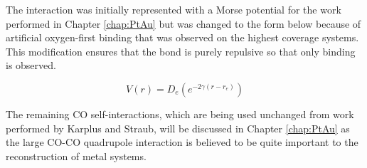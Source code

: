 The  interaction was initially represented with a Morse
potential for the work performed in Chapter \ref{chap:PtAu} but was changed to
the form below because of artificial oxygen-first binding that was observed
on the highest coverage systems. This modification ensures that
the  bond is purely repulsive so that only 
binding is observed.

\begin{equation}
V(r) = D_e(e^{-2\gamma(r-r_e)})
\end{equation}

The remaining CO self-interactions, which are being used unchanged from work
performed by Karplus and Straub,\citep{Straub:1991no} will be discussed in
Chapter \ref{chap:PtAu} as the large CO-CO quadrupole interaction is believed
to be quite important to the reconstruction of metal systems.\citep{Tao:2010aa,
Eren:2016qt}

